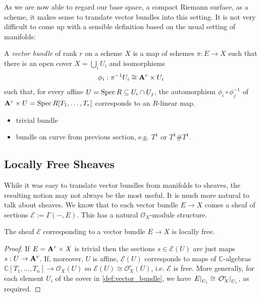 \documentclass[12pt]{ociamthesis}  %
\begin{document}
As we are now able to regard our base space, a compact Riemann
surface, as a scheme, it makes sense to translate vector bundles
into this setting. It is not very difficult to come up with a
sensible definition based on the usual setting of manifolds:

\begin{definition}
  \label{def:vector_bundle}
  A \emph{vector bundle} of rank $r$ on a scheme $X$ is
  a map of schemes $\pi : E \to X$ such that there is an open
  cover $X = \bigcup_i U_i$ and isomorphisms
  \begin{align}\label{eq:trivialisation}
    \phi_i : {\pi}^{-1}U_i \cong \mathbf{A}^{r}_{}\times U_i
  \end{align}
  such that, for every affine $U = \operatorname{Spec} R \subseteq U_i \cap U_j$,
  the automorphism $\phi_i \circ \phi^{-1}_j$
  of $\mathbf{A}^{r}_{}\times U = \operatorname{Spec} R[T_1,\ldots,T_r]$
  corresponds to an $R$-linear map.
\end{definition}

\begin{example}
  \begin{itemize}
    \item trivial bundle
    \item bundle on curve from previous section, e.g. $T^1$ or
      $T^1 \# T^1$.
  \end{itemize}
\end{example}

\missingsection

\subsection{Locally Free Sheaves}

While it was easy to translate vector bundles from manifolds
to sheaves, the resulting notion may not always be the most
useful. It is much more natural to talk about sheaves. We know
that to each vector bundle $E\to X$ comes a sheaf of sections
$\mathcal E := \Gamma(-,E)$. This has a natural $\mathcal O_X$-module structure.

\begin{lemma}
  The sheaf $\mathcal E$ corresponding to a vector bundle $E\to X$
  is locally free.
  \begin{proof}
    If $E=\mathbf{A}^{r}_{}\times X$ is
    trivial then the sections $s\in\mathcal E(U)$ are just maps
    $s:U\to \mathbf{A}^{r}_{}$. If, moreover, $U$ is affine,
    $\mathcal E(U)$ corresponds to maps of $\mathbb{C}$-algebras
    $\mathbb{C}[T_1,\ldots,T_n]\to\mathcal O_X(U)$ so
    $\mathcal E(U)\cong \mathcal O^r_X(U)$, i.e. $\mathcal E$
    is free.
    More generally, for each element $U_i$ of the cover in
    \ref{def:vector_bundle}, we have
    $\left.{E}\right\vert_{U_i}\cong \left.{\mathcal O_X^r}\right\vert_{U_i}$, as
    required.
  \end{proof}
\end{lemma}
\end{document}
